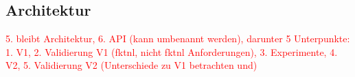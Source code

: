 \subsection{Architektur} \label{sec:Architektur}
    
    
    \textcolor{red}{
        5. bleibt Architektur, 6. \ac{API} (kann umbenannt werden), darunter 5 Unterpunkte: 1. V1, 2. Validierung V1 (fktnl, nicht fktnl Anforderungen), 3. Experimente, 4. V2, 5. Validierung V2 (Unterschiede zu V1 betrachten und)
    }
